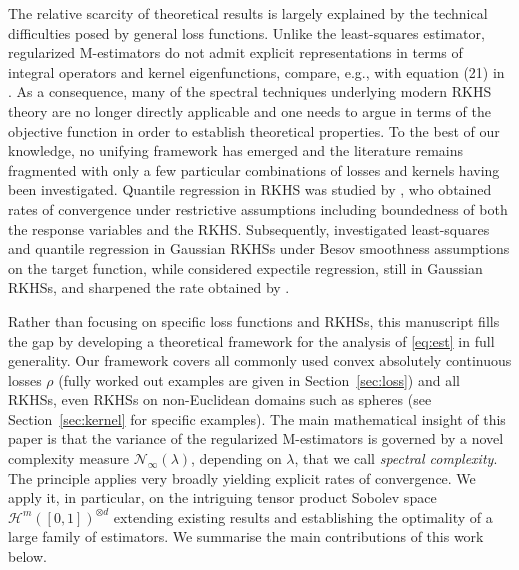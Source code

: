 \documentclass[11pt]{article}
\theoremstyle{definition}
\theoremstyle{remark}
\begin{document}
The relative scarcity of theoretical results is largely explained by the technical difficulties posed by general loss functions. Unlike the least-squares estimator, regularized M-estimators do not admit explicit representations in terms of integral operators and kernel eigenfunctions, compare, e.g., with equation (21) in \citep{Fischer:2020}. As a consequence, many of the spectral techniques underlying modern RKHS theory are no longer directly applicable and one needs to argue in terms of the objective function in order to establish theoretical properties. To the best of our knowledge, no unifying framework has emerged and the literature remains fragmented with only a few particular combinations of losses and kernels having been investigated. Quantile regression in RKHS was studied by \citet{Li:2007}, who obtained rates of convergence under restrictive assumptions including boundedness of both the response variables and the RKHS. Subsequently, \citet{Eberts:2013} investigated least-squares and quantile regression in Gaussian RKHSs under Besov smoothness assumptions on the target function, while \citet{Far:2019} considered expectile regression, still in Gaussian RKHSs, and sharpened the rate obtained  by \citet{Eberts:2013}.

Rather than focusing on specific loss functions and RKHSs, this manuscript fills the gap by developing a theoretical framework for the analysis of \eqref{eq:est} in full generality. Our framework covers all commonly used convex absolutely continuous losses $\rho$ (fully worked out examples are given in Section~\ref{sec:loss}) and all RKHSs, even RKHSs on non-Euclidean domains such as spheres (see Section~\ref{sec:kernel} for specific examples). The main mathematical insight of this paper is that the variance of the regularized M-estimators is governed by a novel complexity measure $\mathcal{N}_{\infty}(\lambda)$, depending on $\lambda$, that we call \textit{spectral complexity}. The principle applies very broadly yielding explicit rates of convergence. We apply it, in particular, on the intriguing tensor product Sobolev space $\mathcal{H}^m([0,1])^{\otimes d}$ extending existing results and establishing the optimality of a large family of estimators. We summarise the main contributions of this work below.
\end{document}
